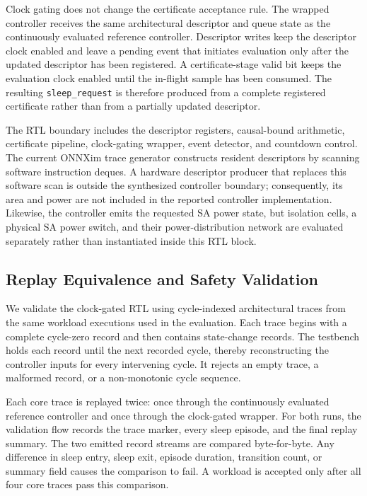 Clock gating does not change the certificate acceptance rule.  The wrapped
controller receives the same architectural descriptor and queue state as the
continuously evaluated reference controller.  Descriptor writes keep the
descriptor clock enabled and leave a pending event that initiates evaluation
only after the updated descriptor has been registered.  A certificate-stage
valid bit keeps the evaluation clock enabled until the in-flight sample has
been consumed.  The resulting \texttt{sleep\_request} is therefore produced
from a complete registered certificate rather than from a partially updated
descriptor.

The RTL boundary includes the descriptor registers, causal-bound arithmetic,
certificate pipeline, clock-gating wrapper, event detector, and countdown
control.  The current ONNXim trace generator constructs resident descriptors
by scanning software instruction deques.  A hardware descriptor producer
that replaces this software scan is outside the synthesized controller
boundary; consequently, its area and power are not included in the reported
controller implementation.  Likewise, the controller emits the requested
SA power state, but isolation cells, a physical SA power switch, and their
power-distribution network are evaluated separately rather than instantiated
inside this RTL block.

\subsection{Replay Equivalence and Safety Validation}
\label{sec:rtl-replay-validation}

We validate the clock-gated RTL using cycle-indexed architectural traces from
the same workload executions used in the evaluation.  Each trace begins with
a complete cycle-zero record and then contains state-change records.  The
testbench holds each record until the next recorded cycle, thereby
reconstructing the controller inputs for every intervening cycle.  It rejects
an empty trace, a malformed record, or a non-monotonic cycle sequence.

Each core trace is replayed twice: once through the continuously evaluated
reference controller and once through the clock-gated wrapper.  For both
runs, the validation flow records the trace marker, every sleep episode, and
the final replay summary.  The two emitted record streams are compared
byte-for-byte.  Any difference in sleep entry, sleep exit, episode duration,
transition count, or summary field causes the comparison to fail.  A workload
is accepted only after all four core traces pass this comparison.

